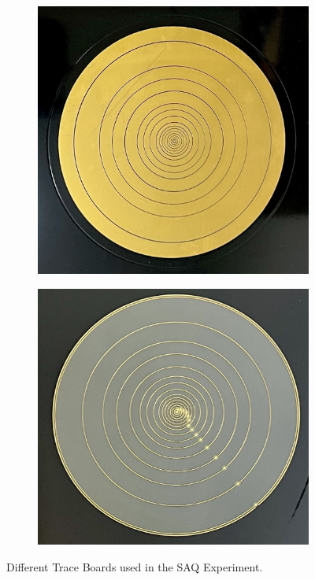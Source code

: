 \begin{figure}[]
\centering
\begin{subfigure}{.5\textwidth}
  \centering
  \includegraphics[width=\textwidth]{images/thick_board_example.jpg}
  \caption{}
\end{subfigure}%
\begin{subfigure}{.5\textwidth}
  \centering
  \includegraphics[width=\textwidth]{images/thin_trace_board_example.jpg}
  \caption{}
\end{subfigure}
\caption{Different Trace Boards used in the SAQ Experiment.}
\label{fig:trace_boards}
\end{figure}

